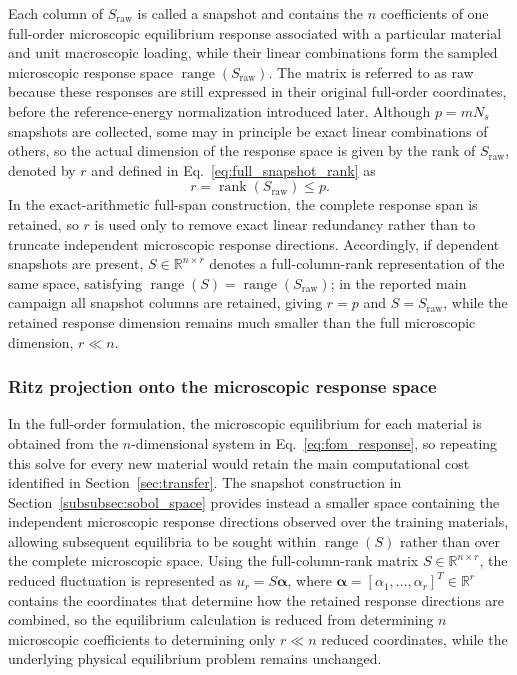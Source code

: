 \documentclass[pdflatex,sn-basic,Numbered]{sn-jnl}
\newcommand{\R}{\mathbb{R}}
\begin{document}
Each column of \(S_{\mathrm{raw}}\) is called a snapshot and contains the
\(n\) coefficients of one full-order microscopic equilibrium response
associated with a particular material and unit macroscopic loading, while
their linear combinations form the sampled microscopic response space
\(\operatorname{range}(S_{\mathrm{raw}})\). The matrix is referred to as raw
because these responses are still expressed in their original full-order
coordinates, before the reference-energy normalization introduced later.
Although \(p=mN_s\) snapshots are collected, some may in principle be exact
linear combinations of others, so the actual dimension of the response space
is given by the rank of \(S_{\mathrm{raw}}\), denoted by \(r\) and defined in
Eq.~\eqref{eq:full_snapshot_rank} as
\begin{equation}
\label{eq:full_snapshot_rank}
r
=
\operatorname{rank}(S_{\mathrm{raw}})
\leq p.
\end{equation}
In the exact-arithmetic full-span construction, the complete response span is retained, so \(r\) is used only to remove exact
linear redundancy rather than to truncate independent microscopic response
directions. Accordingly, if dependent snapshots are present,
\(S\in\R^{n\times r}\) denotes a full-column-rank representation of the same
space, satisfying
\(\operatorname{range}(S)=\operatorname{range}(S_{\mathrm{raw}})\); in the
reported main campaign all snapshot columns are retained, giving \(r=p\) and \(S=S_{\mathrm{raw}}\), while the retained response
dimension remains much smaller than the full microscopic dimension,
\(r\ll n\).

\subsubsection{Ritz projection onto the microscopic response space}
\label{subsubsec:ritz_projection}

In the full-order formulation, the microscopic equilibrium for each material
is obtained from the \(n\)-dimensional system in
Eq.~\eqref{eq:fom_response}, so repeating this solve for every new material
would retain the main computational cost identified in
Section~\ref{sec:transfer}. The snapshot construction in
Section~\ref{subsubsec:sobol_space} provides instead a smaller space
containing the independent microscopic response directions observed over the
training materials, allowing subsequent equilibria to be sought within
\(\operatorname{range}(S)\) rather than over the complete microscopic space.
Using the full-column-rank matrix \(S\in\R^{n\times r}\), the reduced
fluctuation is represented as \(u_r=S\boldsymbol\alpha\), where
\(\boldsymbol\alpha=[\alpha_1,\ldots,\alpha_r]^T\in\R^r\) contains the
coordinates that determine how the retained response directions are combined,
so the equilibrium calculation is reduced from determining \(n\) microscopic
coefficients to determining only \(r\ll n\) reduced coordinates, while the
underlying physical equilibrium problem remains unchanged.
\end{document}
